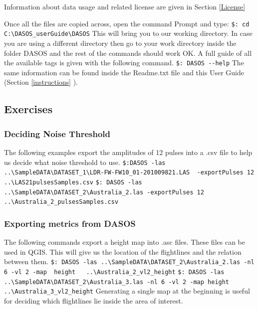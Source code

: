 \documentclass{subfiles}
\begin{document}
	   	
	    \par Information about data usage and related license are given in Section \ref{License}
	   	
		\par Once all the files are copied across, open the command Prompt and type:\newline
		\verb|$: cd C:\DASOS_userGuide\DASOS| \newline 
		This will bring you to our working directory. In case you are using a different directory then go to your work directory inside the folder DASOS and the rest of the commands should work OK. 
        \newline\newline
		A full guide of all the available tags is given with the following command. \newline
		\verb|$: DASOS --help| \newline
		 The same information can be found inside the Readme.txt file and this User Guide (Section \ref{instructions} ).
		
	   	\subsection{Exercises}
		\subsubsection{Deciding Noise Threshold}
		The following examples export the amplitudes of 12 pulses into a .csv file to help us decide what noise threshold to use. \newline\newline
		\verb|$:DASOS -las ..\SampleDATA\DATASET_1\LDR-FW-FW10_01-201009821.LAS |\newline \verb| -exportPulses 12   ..\LAS21pulsesSamples.csv|
		\newline\newline
		\verb|$: DASOS -las ..\SampleDATA\DATASET_2\Australia_2.las -exportPulses 12|\newline \verb|   ..\Australia_2_pulsesSamples.csv|
				
		\subsubsection{Exporting metrics from DASOS}
		The following commands export a height map into .asc files. These files can be used in QGIS. This will give us the location of the flightlines and the relation between them.
		\newline\newline
		\verb|$: DASOS -las ..\SampleDATA\DATASET_2\Australia_2.las -nl 6 -vl 2 -map |\newline \verb| height   ..\Australia_2_vl2_height|				
		\newline\newline
		\verb|$: DASOS -las ..\SampleDATA\DATASET_2\Australia_3.las -nl 6 -vl 2 -map|\newline \verb| height   ..\Australia_3_vl2_height|
		\newline\newline
		Generating a single map at the beginning is useful for deciding which flightlines lie inside the area of interest. 
		
\end{document}
